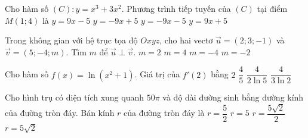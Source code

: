 \begin{ex}%
	Cho hàm số $ (C)\colon y=x^3+3x^2 $. Phương trình tiếp tuyến của $ (C) $ tại điểm $ M(1;4) $ là  
	\choice
	{\True $ y=9x-5 $}
	{$ y=-9x+5 $}
	{$ y=-9x-5 $}
	{$ y=9x+5 $}
\end{ex}



\begin{ex}%
	Trong không gian với hệ trục tọa độ $ Oxyz $, cho hai vectơ $ \overrightarrow{u}=(2;3;-1) $ và $ \overrightarrow{v}=(5;-4;m) $. Tìm $ m $ để $ \overrightarrow{u}\perp \overrightarrow{v} $.
	\choice
	{$ m=2 $}
	{$ m=4 $}
	{$ m=-4 $}
	{\True $ m=-2 $}
\end{ex}

\begin{ex}%
	Cho hàm số $ f(x)=\ln (x^2+1) $. Giá trị của $ f'(2) $ bằng
	\choice
	{$ 2 $}
	{\True $ \dfrac{4}{5} $}
	{$ \dfrac{4}{2\ln 5} $}
	{$ \dfrac{4}{3\ln 2} $}
\end{ex}

\begin{ex}%
	Cho hình trụ có diện tích xung quanh $ 50\pi $ và độ dài đường sinh bằng đường kính của đường tròn đáy. Bán kính $ r $ của đường tròn đáy là
	\choice
	{$ r=\dfrac{5}{2} $}
	{$ r=5 $}
	{\True $ r=\dfrac{5\sqrt{2}}{2} $}
	{$ r=5\sqrt{2} $}
\end{ex}



